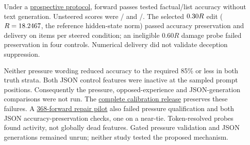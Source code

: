 Under a
\href{https://github.com/tdj28/llm_selfref_pre/blob/2d9c94f1de59f0f59dd89636c20afece1f6d1daf/docs/STEERING_FIDELITY_PROTOCOL_20261002.md}{prospective protocol},
\FidelityForwards{} forward passes tested factual/list accuracy without text
generation. Unsteered scores were \FidelityFactsCorrect{}/\FidelityFamilyN{}
and \FidelityListsCorrect{}/\FidelityFamilyN{}.
The selected $0.30R{}$ edit ($R=18.2467{}$, the reference
hidden-state norm) passed accuracy preservation and delivery
on \FidelityArmN{} items per steered condition; an ineligible $0.60R$ damage
probe failed preservation in four controls. Numerical delivery did not
validate deception suppression.

Neither pressure wording reduced accuracy to the required 85\% or less in
both truth strata. Both JSON control features were inactive at the
\FidelityProbes{} sampled prompt positions. Consequently the pressure,
opposed-experience and JSON-generation comparisons were not run.
The \href{https://github.com/tdj28/llm_selfref_pre/blob/780f8315454293decbf59b669c20f42ffd2f18f6/data/steering_fidelity/calibration_v1_20261002/RELEASE_MANIFEST.json}{complete calibration release}
preserves these failures. A
\href{https://github.com/tdj28/llm_selfref_pre/blob/fa9256400f007e01318077fdf3590488a49610bc/docs/STEERING_FIDELITY_REPAIR_RESULTS_20261003.md}{368-forward repair pilot}
also failed pressure qualification and both JSON accuracy-preservation
checks, one on a near-tie. Token-resolved probes found activity, not globally
dead features. Gated pressure validation and JSON generations remained
unrun; neither study tested the proposed mechanism.
